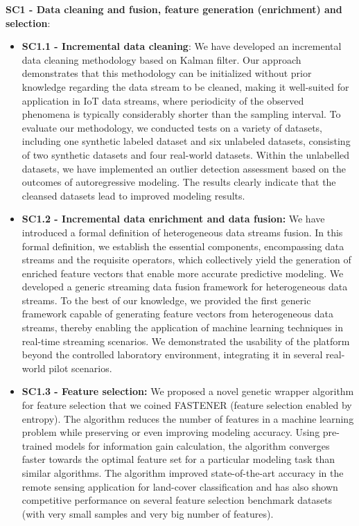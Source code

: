\noindent \noindent \textbf{SC1 - Data cleaning and fusion, feature generation (enrichment) and selection}: 
\begin{itemize}
    \item \textbf{SC1.1 - Incremental data cleaning}: 
        We have developed an incremental data cleaning methodology based on Kalman filter.
        Our approach demonstrates that this methodology can be initialized without prior knowledge regarding the data stream to be cleaned, making it well-suited for application in IoT data streams, where periodicity of the observed phenomena is typically considerably shorter than the sampling interval.
        To evaluate our methodology, we conducted tests on a variety of datasets, including one synthetic labeled dataset and six unlabeled datasets, consisting of two synthetic datasets and four real-world datasets.
        Within the unlabelled datasets, we have implemented an outlier detection assessment based on the outcomes of autoregressive modeling. The results clearly indicate that the cleansed datasets lead to improved modeling results.
    \item \textbf{SC1.2 - Incremental data enrichment and data fusion:} 
        We have introduced a formal definition of heterogeneous data streams fusion. 
        In this formal definition, we establish the essential components, encompassing data streams and the requisite operators, which collectively yield the generation of enriched feature vectors that enable more accurate predictive modeling.
        We developed a generic streaming data fusion framework for heterogeneous data streams. 
        To the best of our knowledge, we provided the first generic framework capable of generating feature vectors from heterogeneous data streams, thereby enabling the application of machine learning techniques in real-time streaming scenarios.
        We demonstrated the usability of the platform beyond the controlled laboratory environment, integrating it in several real-world pilot scenarios.        
    \item \textbf{SC1.3 - Feature selection:}
        We proposed a novel genetic wrapper algorithm for feature selection that we coined FASTENER (feature selection enabled by entropy).
        The algorithm reduces the number of features in a machine learning problem while preserving or even improving modeling accuracy.
        Using pre-trained models for information gain calculation, the algorithm converges faster towards the optimal feature set for a particular modeling task than similar algorithms.
        The algorithm improved state-of-the-art accuracy in the remote sensing application for land-cover classification and has also shown competitive performance on several feature selection benchmark datasets (with very small samples and very big number of features).        
\end{itemize}

